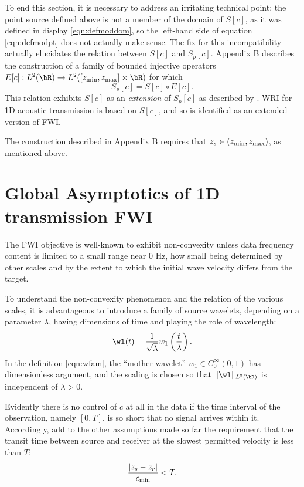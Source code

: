 To end this section, it is necessary to address an irritating
technical point: the point source defined above is not a member of the
domain of $S[c]$, as it was defined in display \ref{eqn:defmoddom}, so
the left-hand side of equation \ref{eqn:defmodpt} does not actually
make sense. The fix for this incompatibility actually elucidates the
relation between $S[c]$ and $S_p[c]$. Appendix B describes the
construction of a family of bounded injective operators  $E[c]: L^2(\bR) \rightarrow L^2([z_{\rm min},z_{\rm max}] \times \bR)$ for which
\begin{equation}
  \label{eqn:ext}
  S_p[c] = S[c] \circ E[c].
\end{equation}
This relation exhibits $S[c]$ as an {\em extension} of $S_p[c]$ as
described by \cite{Symes:09}. WRI for 1D acoustic transmission is
based on $S[c]$, and so is identified as an extended version of FWI.

The construction described in Appendix B requires that $z_s \in
(z_{\rm min},z_{\rm max})$, as mentioned above.

\section{Global Asymptotics of 1D transmission FWI}
The FWI objective is well-known to exhibit non-convexity unless
data frequency content is limited to a small range near 0 Hz, how
small being determined by other scales and by the extent to which the
initial wave velocity differs from the target.

To understand the non-convexity phenomenon and the
relation of the various scales, it is advantageous to introduce a
family of source wavelets, depending on a parameter $\lambda$, having
dimensions of time and playing
the role of wavelength:
\begin{equation}
  \label{eqn:wfam}
  \wl(t) = \frac{1}{\sqrt{\lambda}}w_1\left(\frac{t}{\lambda}\right).
\end{equation}
In the definition \ref{eqn:wfam}, the ``mother wavelet'' $w_1\in
C_0^{\infty}(0,1)$ has dimensionless argument, and the scaling is chosen so that
$\|\wl\|_{L^2(\bR)}$ is independent of $\lambda>0$.

Evidently there is no control of $c$ at all in the data if the time
interval of the observation, namely $[0,T]$, is so short that no
signal arrives within it. Accordingly, add to the other assumptions
made so far
the requirement that the transit time between source and receiver at
the slowest permitted velocity is less than $T$:
\begin{equation}
   \label{eqn:time}
  \frac{|z_s-z_r|}{c_{\rm min}} < T.
\end{equation}

